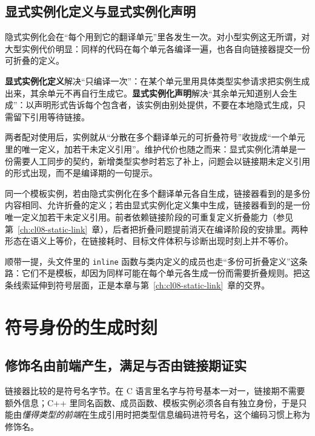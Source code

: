 \documentclass[12pt,a4paper,fontset=fandol]{ctexbook}
\newcommand{\cpp}[1]{C++#1}
\newcommand{\Tp}[1]{\texttt{#1}}
\begin{document}
\subsection{显式实例化定义与显式实例化声明}\label{sec:cl03-explicit}

隐式实例化会在“每个用到它的翻译单元”里各发生一次。对小型实例这无所谓，对大型实例代价明显：同样的代码在每个单元各编译一遍，也各自向链接器提交一份可折叠的定义。

\textbf{显式实例化定义}解决“只编译一次”：在某个单元里用具体类型实参请求把实例生成出来，其余单元不再自行生成它。\textbf{显式实例化声明}解决“其余单元知道别人会生成”：以声明形式告诉每个包含者，该实例由别处提供，不要在本地隐式生成，只需留下引用等待链接。

两者配对使用后，实例就从“分散在多个翻译单元的可折叠符号”收拢成“一个单元里的唯一定义，加若干未定义引用”。维护代价也随之而来：显式实例化清单是一份需要人工同步的契约，新增类型实参时若忘了补上，问题会以链接期未定义引用的形式出现，而不是编译期的一句提示。

\begin{abibox}[title={实例化时机决定链接期身份}]
同一个模板实例，若由隐式实例化在多个翻译单元各自生成，链接器看到的是多份内容相同、允许折叠的定义；若由显式实例化定义集中生成，链接器看到的是一份唯一定义加若干未定义引用。前者依赖链接阶段的可重复定义折叠能力（参见第~\ref{ch:cl08-static-link}~章），后者把折叠问题提前消灭在编译阶段的安排里。两种形态在语义上等价，在链接耗时、目标文件体积与诊断出现时刻上并不等价。
\end{abibox}

顺带一提，头文件里的 \Tp{inline} 函数与类内定义的成员也走“多份可折叠定义”这条路：它们不是模板，却因为同样可能在每个单元各生成一份而需要折叠规则。把这条线索延伸到符号层面，正是本章与第~\ref{ch:cl08-static-link}~章的交界。

\section{符号身份的生成时刻}\label{sec:cl03-mangling}

\subsection{修饰名由前端产生，满足与否由链接期证实}\label{sec:cl03-mangling-when}

链接器比较的是符号名字节。在 C 语言里名字与符号基本一对一，链接期不需要额外信息；\cpp{} 里同名函数、成员函数、模板实例必须各自有独立身份，于是只能由\emph{懂得类型的前端}在生成引用时把类型信息编码进符号名，这个编码习惯上称为修饰名。
\end{document}
